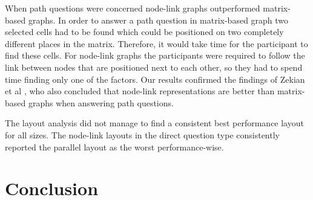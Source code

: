 \documentclass{l4proj}
\begin{document}
When path questions were concerned node-link graphs outperformed matrix-based graphs. In order to answer a path question in matrix-based graph two selected cells had to be found which could be positioned on two completely different places in the matrix. Therefore, it would take time for the participant to find these cells. For node-link graphs the participants were required to follow the link between nodes that are positioned next to each other, so they had to spend time finding only one of the factors.  Our results confirmed the findings of Zekian et al \cite{sheny2007path}, who also concluded that node-link representations are better than matrix-based graphs when answering path questions. 

The layout analysis did not manage to find a consistent best performance layout for all sizes. The node-link layouts in the direct question type consistently reported the parallel layout as the worst performance-wise. 


\section{Conclusion}
\end{document}
